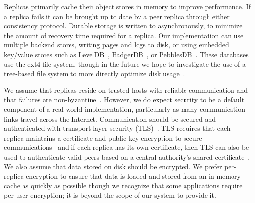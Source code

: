 Replicas primarily cache their object stores in memory to improve performance.
If a replica fails it can be brought up to date by a peer replica through either consistency protocol.
Durable storage is written to asynchronously, to minimize the amount of recovery time required for a replica.
Our implementation can use multiple backend stores, writing pages and logs to disk, or using embedded key/value stores such as LevelDB~\cite{leveldb}, BadgerDB~\cite{badgerdb}, or PebblesDB~\cite{pebblesdb}.
These databases use the ext4 file system, though in the future we hope to investigate the use of a tree-based file system to more directly optimize disk usage~\cite{btrfs}.

We assume that replicas reside on trusted hosts with reliable communication and that failures are non-byzantine~\cite{byzantine-generals,byzantine_fault_tolerance}.
However, we do expect security to be a default component of a real-world implementation, particularly as many communication links travel across the Internet.
Communication should be secured and authenticated with transport layer security (TLS)~\cite{tlsv1,tlsv2}.
TLS requires that each replica maintains a certificate and public key encryption to secure communications~\cite{rsa} and if each replica has its own certificate, then TLS can also be used to authenticate valid peers based on a central authority's shared certificate~\cite{tls_authentication}.
We also assume that data stored on disk should be encrypted.
We prefer per-replica encryption to ensure that data is loaded and stored from an in-memory cache as quickly as possible though we recognize that some applications require per-user encryption; it is beyond the scope of our system to provide it.

